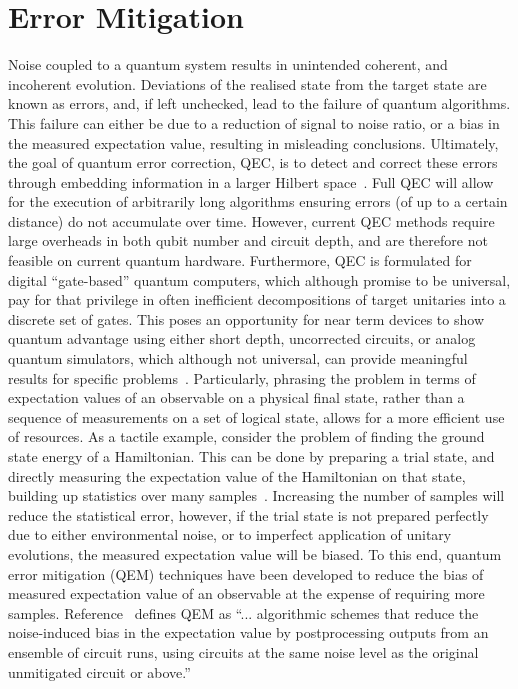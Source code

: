 \section{Error Mitigation}
Noise coupled to a quantum system results in unintended coherent, and incoherent
evolution. Deviations of the realised state from the target state are known as
errors, and, if left unchecked, lead to the failure of quantum algorithms. 
This failure can either be due to a reduction of signal to noise ratio, or a
bias in the measured expectation value, resulting in misleading conclusions. 
Ultimately, the goal of quantum error correction, QEC, is to detect and correct
these errors through embedding information in a larger Hilbert space~\cite{qec_review}.
Full QEC will allow for the execution of arbitrarily long algorithms ensuring errors (of
up to a certain distance) do not accumulate over time. However, current QEC
methods require large overheads in both qubit number and circuit depth, and are
therefore not feasible on current quantum hardware. Furthermore, QEC is
formulated for digital ``gate-based'' quantum computers, which although promise
to be universal, pay for that privilege in often inefficient decompositions of
target unitaries into a discrete set of gates. 
This poses an opportunity for
near term devices to show quantum advantage using either short depth,
uncorrected circuits, or analog quantum simulators, which although not
universal, can provide meaningful results for specific problems~\cite{nisq_review}. Particularly,
phrasing the problem in terms of expectation values of an observable on a
physical final state, rather than a sequence of measurements on a set of logical
state, allows for a more efficient use of resources. As a tactile example,
consider the problem of finding the ground state energy of a Hamiltonian. This
can be done by preparing a trial state, and directly measuring the expectation
value of the Hamiltonian on that state, building up statistics over many
samples~\cite{variational_qc_review}. Increasing the number of samples will reduce the statistical error,
however, if the trial state is not prepared perfectly due to either
environmental noise, or to imperfect application of unitary evolutions, the
measured expectation value will be biased. 
To this end, quantum error
mitigation (QEM) techniques have been developed to reduce the bias of measured
expectation value of an observable at the expense of requiring more samples. 
Reference~\cite{cai_quantum_2023} defines QEM as
``... algorithmic schemes that reduce the noise-induced bias in the expectation value by postprocessing outputs from an ensemble of circuit runs, using circuits at the same noise level as the original unmitigated circuit or above.''
